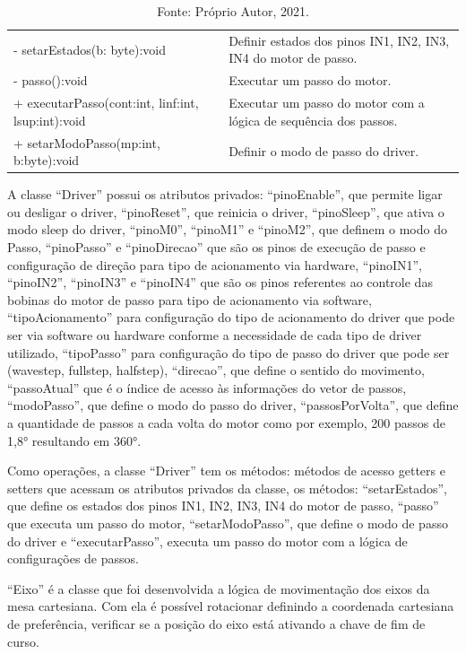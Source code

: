\begin{table}[H]
\begin{tabular}{p{8cm}p{6cm}}
        - setarEstados(b: byte):void & Definir estados dos pinos IN1, IN2, IN3, IN4 do motor de passo.\\
        - passo():void & Executar um passo do motor.\\
        + executarPasso(cont:int, linf:int, lsup:int):void & Executar um passo do motor com a lógica de sequência dos passos.\\
        + setarModoPasso(mp:int, b:byte):void & Definir o modo de passo do driver.\\
        \hline       
    \end{tabular}
    \caption*{Fonte: Próprio Autor, 2021.}
    \label{tab:classedriver}
\end{table}

A classe “Driver” possui os atributos privados: “pinoEnable”, que permite ligar ou desligar o driver, 
“pinoReset”, que reinicia o driver, “pinoSleep”, que ativa o modo sleep do driver, “pinoM0”, “pinoM1” 
e “pinoM2”, que definem o modo do Passo, “pinoPasso” e “pinoDirecao” que são os pinos de execução de 
passo e configuração de direção para tipo de acionamento via hardware, “pinoIN1”, “pinoIN2”, “pinoIN3” 
e “pinoIN4” que são os pinos referentes ao controle das bobinas do motor de passo para tipo de acionamento 
via software, “tipoAcionamento” para configuração do tipo de acionamento do driver que pode ser via software 
ou hardware conforme a necessidade de cada tipo de driver utilizado, “tipoPasso” para configuração do tipo 
de passo do driver que pode ser (wavestep, fullstep, halfstep), “direcao”, que define o sentido do movimento, 
“passoAtual” que é o índice de acesso às informações do vetor de passos, “modoPasso”, que define o modo do 
passo do driver, “passosPorVolta”, que define a quantidade de passos a cada volta do motor como por exemplo, 
200 passos de 1,8° resultando em 360°. 

Como operações, a classe “Driver” tem os métodos: métodos de acesso getters e setters que acessam os 
atributos privados da classe, os métodos: “setarEstados”, que define os estados dos pinos IN1, IN2, IN3, 
IN4 do motor de passo, “passo” que executa um passo do motor, “setarModoPasso”, que define o modo de passo 
do driver e “executarPasso”, executa um passo do motor com a lógica de configurações de passos.

“Eixo” é a classe que foi desenvolvida a lógica de movimentação dos eixos da mesa cartesiana. Com ela é 
possível rotacionar definindo a coordenada cartesiana de preferência, verificar se a posição do eixo 
está ativando a chave de fim de curso.


